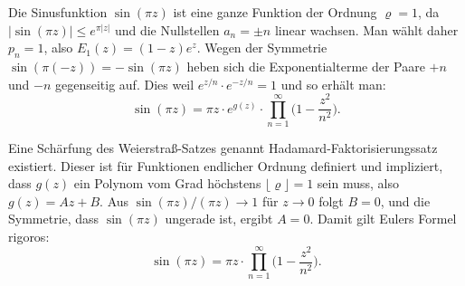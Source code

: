Die Sinusfunktion $\sin(\pi z)$ ist eine ganze Funktion der Ordnung $\varrho = 1$,
da $|\sin(\pi z)| \le e^{\pi|z|}$ und die Nullstellen $a_n = \pm n$ linear wachsen.
Man wählt daher $p_n = 1$, also $E_1(z) = (1-z)e^z$.
Wegen der Symmetrie $\sin(\pi(-z)) = -\sin(\pi z)$ heben sich die Exponentialterme
der Paare $+n$ und $-n$ gegenseitig auf.
Dies weil $e^{z/n} \cdot e^{-z/n} = 1$ und so erhält man:
\begin{equation}
\sin(\pi z)
=
\pi z \cdot e^{g(z)} \cdot \prod_{n=1}^{\infty} \biggl(1 - \frac{z^2}{n^2}\biggr).
\end{equation}

Eine Schärfung des Weierstraß-Satzes genannt Hadamard-Faktorisierungssatz existiert.
%
%
Dieser ist für Funktionen endlicher Ordnung definiert und impliziert, dass $g(z)$ ein Polynom vom Grad
höchstens $\lfloor \varrho \rfloor = 1$ sein muss, also $g(z) = Az + B$.
Aus $\sin(\pi z)/(\pi z) \to 1$ für $z \to 0$ folgt $B = 0$,
und die Symmetrie, dass $\sin(\pi z)$ ungerade ist, ergibt $A = 0$.
Damit gilt Eulers Formel rigoros:
\begin{equation}
\sin(\pi z)
=
\pi z \cdot \prod_{n=1}^{\infty} \biggl(1 - \frac{z^2}{n^2}\biggr).
\end{equation}
